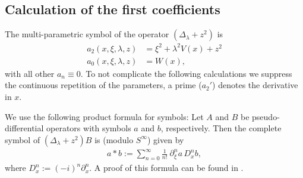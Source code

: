 \subsection{Calculation of the first coefficients}
The multi-parametric symbol of the operator $(\Delta_\lambda + z^2)$ is
\begin{align}
  a_2(x,\xi,\lambda,z) &= \xi^2 + \lambda^2 V(x) + z^2 \\
  a_0(x,\xi,\lambda,z) &= W(x),
  \label{eqn:symbol}
\end{align}
with all other $a_n \equiv 0$. To not complicate the following calculations we
suppress the continuous repetition of the parameters, a prime ($a_2'$) denotes
the derivative in $x$.

We use the following product formula for symbols: Let $A$ and $B$ be
pseudo-differential operators with symbols $a$ and $b$, respectively. Then the
complete symbol of $(\Delta_\lambda + z^2)B$ is (modulo $S^\infty$) given by
\begin{align}
  a * b := \sum_{n=0}^{\infty} \frac{1}{n!}\ \partial_\xi^n a\,D_x^n b,
  \label{eqn:product-formula}
\end{align}
where $D_x^n := (-i)^n \partial_x^n$. A proof of this formula can be found in
\cite[Thm 3.4]{Shu:POS}.

